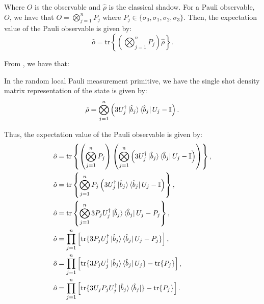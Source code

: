 \documentclass[12pt]{article}
\begin{document}
    Where $O$ is the observable and $\hat{\rho}$ is the classical shadow. For a Pauli observable, $O$, we have that $O = \bigotimes_{j=1}^n P_j$ where $P_j \in \{ \sigma_0, \sigma_1, \sigma_2, \sigma_3 \}$. Then, the expectation value of the Pauli observable is given by:
    \begin{equation*}
        \hat{o} = \text{tr}\left\{\left( \bigotimes_{j=1}^n P_j \right) \hat{\rho}\right\}.
    \end{equation*}

    From \cite{Huang_Kueng_Preskill_2020}, we have that:
    \begin{theorem}
        In the random local Pauli measurement primitive, we have the single shot density matrix representation of the state is given by:
        \begin{equation}
            \hat{\rho} = \bigotimes^n_{j=1}\left(3U_j^\dagger\ket{\hat{b}_j}\bra{\hat{b}_j}U_j - \mathbb{I} \right).
        \end{equation}
    \end{theorem}

    Thus, the expectation value of the Pauli observable is given by:
    \begin{align*}
        \hat{o} &= \text{tr}\left\{\left( \bigotimes_{j=1}^n P_j \right) \left( \bigotimes^n_{j=1}\left(3U_j^\dagger\ket{\hat{b}_j}\bra{\hat{b}_j}U_j - \mathbb{I} \right) \right)\right\},\\
        \hat{o} &= \text{tr}\left\{ \bigotimes_{j=1}^n P_j  \left(3U_j^\dagger\ket{\hat{b}_j}\bra{\hat{b}_j}U_j - \mathbb{I} \right) \right\},\\
        \hat{o} &= \text{tr}\left\{ \bigotimes_{j=1}^n 3P_jU_j^\dagger\ket{\hat{b}_j}\bra{\hat{b}_j}U_j - P_j  \right\},\\
        \hat{o} &= \prod_{j=1}^n \left[ \text{tr}\{ 3 P_j U^\dagger_j \ket{\hat{b}_j}\bra{\hat{b}_j}U_j -  P_j \} \right],\\
        \hat{o} &= \prod_{j=1}^n \left[ \text{tr}\{ 3 P_j U^\dagger_j \ket{\hat{b}_j}\bra{\hat{b}_j}U_j\} - \text{tr}\{ P_j \} \right],\\
        \hat{o} &= \prod_{j=1}^n \left[ \text{tr}\{ 3 U_jP_j U^\dagger_j \ket{\hat{b}_j}\bra{\hat{b}_j}\} - \text{tr}\{ P_j \} \right].
    \end{align*}


    \printbibliography[title={References}]
\end{document}
